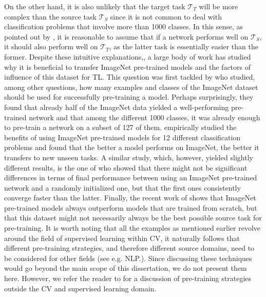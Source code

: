 On the other hand, it is also unlikely that the target task $\mathcal{T}_T$ will be more complex than the source task $\mathcal{T}_S$ since it is not common to deal with classification problems that involve more than 1000 classes. In this sense, as pointed out by \citet{mensink2021factors}, it is reasonable to assume that if a network performs well on $\mathcal{T}_S$, it should also perform well on $\mathcal{T}_T$, as the latter task is essentially easier than the former. Despite these intuitive explanations,, a large body of work has studied why it is beneficial to transfer ImageNet pre-trained models and the factors of influence of this dataset for TL. This question was first tackled by \citet{huh2016makes} who studied, among other questions, how many examples and classes of the ImageNet dataset should be used for successfully pre-training a model. Perhaps surprisingly, they found that already half of the ImageNet data yielded a well-performing pre-trained network and that among the different 1000 classes, it was already enough to pre-train a network on a subset of 127 of them. \citet{kornblith2019better} empirically studied the benefits of using ImageNet pre-trained models for 12 different classification problems and found that the better a model performs on ImageNet, the better it transfers to new unseen tasks. A similar study, which, however, yielded slightly different results, is the one of \citet{he2019rethinking} who showed that there might not be significant differences in terms of final performance between using an ImageNet pre-trained network and a randomly initialized one, but that the first ones consistently converge faster than the latter. Finally, the recent work of \citet{mensink2021factors} shows that ImageNet pre-trained models always outperform models that are trained from scratch, but that this dataset might not necessarily always be the best possible source task for pre-training. It is worth noting that all the examples as mentioned earlier revolve around the field of supervised learning within CV, it naturally follows that different pre-training strategies, and therefore different source domains, need to be considered for other fields (see e.g. NLP.). Since discussing these techniques would go beyond the main scope of this dissertation, we do not present them here. However, we refer the reader to \cite{mikolov2013efficient,rosset2020knowledge,brown2020language,devlin2018bert} for a discussion of pre-training strategies outside the CV and supervised learning domain.

